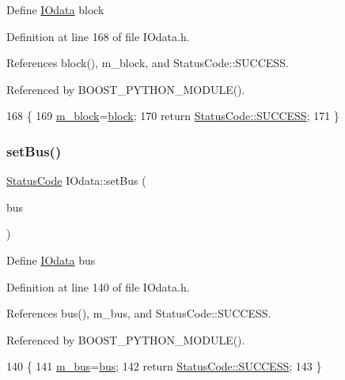 Define \hyperlink{classIOdata}{I\+Odata} block 

Definition at line 168 of file I\+Odata.\+h.



References block(), m\+\_\+block, and Status\+Code\+::\+S\+U\+C\+C\+E\+SS.



Referenced by B\+O\+O\+S\+T\+\_\+\+P\+Y\+T\+H\+O\+N\+\_\+\+M\+O\+D\+U\+L\+E().


\begin{DoxyCode}
168                                 \{
169     \hyperlink{classIOdata_a6d1ce9f88db6b97ce61098a3693e253f}{m\_block}=\hyperlink{classIOdata_aeda27840c9a9b7b3b86efc71c56cd868}{block};
170     \textcolor{keywordflow}{return} \hyperlink{classStatusCode_a6f565cbeadc76d14c72f047e5e85eb4badd0da38d3ba0d922efd1f4619bc37ad8}{StatusCode::SUCCESS};
171   \}
\end{DoxyCode}
\mbox{\label{classIOdata_aca154b90e490608b5b5c0ead58e1fafc}} 
\subsubsection{\texorpdfstring{set\+Bus()}{setBus()}}
{\footnotesize\ttfamily \hyperlink{classStatusCode}{Status\+Code} I\+Odata\+::set\+Bus (\begin{DoxyParamCaption}\item[{\hyperlink{classIOdata_a99aa7bed39364c4359ab8a7596bc013c}{I\+Odata\+::\+Bus}}]{bus }\end{DoxyParamCaption})\hspace{0.3cm}{\ttfamily [inline]}}

Define \hyperlink{classIOdata}{I\+Odata} bus 

Definition at line 140 of file I\+Odata.\+h.



References bus(), m\+\_\+bus, and Status\+Code\+::\+S\+U\+C\+C\+E\+SS.



Referenced by B\+O\+O\+S\+T\+\_\+\+P\+Y\+T\+H\+O\+N\+\_\+\+M\+O\+D\+U\+L\+E().


\begin{DoxyCode}
140                                   \{
141     \hyperlink{classIOdata_a42c07a9b3f43ec35dd18d13a67d294cc}{m\_bus}=\hyperlink{classIOdata_ab904bcca0e8e3bebc3299e47ca93a8a1}{bus};
142     \textcolor{keywordflow}{return} \hyperlink{classStatusCode_a6f565cbeadc76d14c72f047e5e85eb4badd0da38d3ba0d922efd1f4619bc37ad8}{StatusCode::SUCCESS};
143   \}
\end{DoxyCode}
\mbox{\label{classIOdata_a1796a65cbd8c4326e80d662034ee5e39}} 
